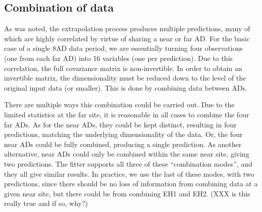 \documentclass[../thesis.tex]{subfiles}
\begin{document}
\begin{comment}
In the fit, we compare the far site measurement to the far site prediction as obtained from the near sites. Statistical uncertainty arises from both the near sites (in the form of fluctuations in the far site prediction) and from the far site data itself. We have the two expressions for each component.

Without affecting the fit, we can simplify the situation by assigning both components of the statistical uncertainty to the far site \emph{predictions}, with no error bars on the far site data.

The predictions at the same far AD, but from different near ADs, are statistically correlated via the statistical fluctuations at the far AD. The resulting covariance is the product of the two $\sigma_{\mathrm{far}}$.

Likewise, the predictions at different far ADs, but from the same near AD, are correlated via the fluctuations at the near AD. This gives a covariance of the product of the two $\sigma_{\mathrm{near}}$.

I don't know how to prove these claims about the covariances.

From this we can straightforwardly generalize to the full statistical covariance matrix across all ADs, energy bins, and data periods.
\end{comment}

\subsection{Combination of data}
\label{sec:fitCombo}

As was noted, the extrapolation process produces multiple predictions, many of which are highly correlated by virtue of sharing a near or far AD. For the basic case of a single 8AD data period, we are essentially turning four observations (one from each far AD) into 16 variables (one per prediction). Due to this correlation, the full covariance matrix is non-invertible. In order to obtain an invertible matrix, the dimensionality must be reduced down to the level of the original input data (or smaller). This is done by combining data between ADs.

There are multiple ways this combination could be carried out. Due to the limited statistics at the far site, it is reasonable in all cases to combine the four far ADs. As for the near ADs, they could be kept distinct, resulting in four predictions, matching the underlying dimensionality of the data. Or, the four near ADs could be fully combined, producing a single prediction. As another alternative, near ADs could only be combined within the same near site, giving two predictions. The fitter supports all three of these ``combination modes'', and they all give similar results. In practice, we use the last of these modes, with two predictions, since there should be no loss of information from combining data at a given near site, but there could be from combining EH1 and EH2. (XXX is this really true and if so, why?)
\end{document}
